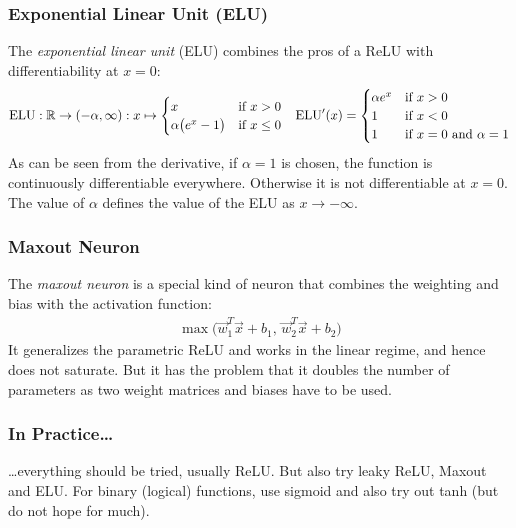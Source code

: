 		\subsubsection{Exponential Linear Unit (ELU)}
			The \emph{exponential linear unit} (ELU) combines the pros of a ReLU with differentiability at \(x = 0\):
			\begin{align}
				\mathrm{ELU} : \mathbb{R} \to (-\alpha, \infty) : x \mapsto
					\begin{cases}
						x                          & \text{if } x > 0    \\
						\alpha \big( e^x - 1 \big) & \text{if } x \leq 0
					\end{cases} &&
				\mathrm{ELU}'(x) =
					\begin{cases}
						\alpha e^x & \text{if } x > 0 \\
						1          & \text{if } x < 0 \\
						1          & \text{if } x = 0 \text{ and } \alpha = 1
					\end{cases}
			\end{align}
			As can be seen from the derivative, if \(\alpha = 1\) is chosen, the function is continuously differentiable everywhere. Otherwise it is not differentiable at \(x = 0\). The value of \(\alpha\) defines the value of the ELU as \(x \to -\infty\).

		\subsubsection{Maxout Neuron}
			The \emph{maxout neuron} is a special kind of neuron that combines the weighting and bias with the activation function:
			\begin{align}
				\max\bigl( \vec{w}_1^T \vec{x} + b_1,\, \vec{w}_2^T \vec{x} + b_2 \bigr)
			\end{align}
			It generalizes the parametric ReLU and works in the linear regime, and hence does not saturate. But it has the problem that it doubles the number of parameters as two weight matrices and biases have to be used.

		\subsubsection{In Practice\dots}
			\dots everything should be tried, usually ReLU. But also try leaky ReLU, Maxout and ELU. For binary (logical) functions, use sigmoid and also try out tanh (but do not hope for much).

